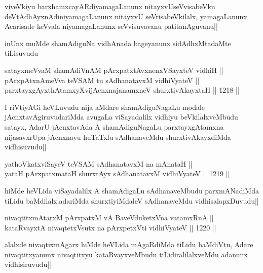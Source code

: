 \begin{artha}
viveVkiyu barxhamxcayARdiyamagaLanunx nitayxvUseVvisabeVku 
deVtAdhAyxnAdiniyamagaLanunx nitayxvU seVrisabeVkilalx, yamagaLanunx Acarisade keVvala 
niyamagaLanunx seVvisuvavanu patitanAguvanu||
\end{artha}

\begin{artha}
inUnx muMde shamAdiguNa vidhAnada bageyanunx sidAdhxMtadaMte tiLisuvudu
\end{artha}

\begin{shl}
satayxmeVvaM shamAdiVnAM pArxpatxtAvxnenxVSayxteV vidhiH || \\
pArxpAtxnAmeVva teVSAM tu sAdhanatavxM vidhiVyateV || \\
parxtayxgAyxthAtamxyXvijAcnxnajanamxneV shurxtivAkayxtaH ||  1218 ||  
\end{shl}

\begin{artha}
I riVtiyAGi heVLuvudu nija aMdare shamAdiguNagaLu modale jAcnxtavAgiruvudariMda avugaLa viSayadalilx vidhiyu beVkilalxveMbudu satayx, AdarU jAcnxtavAda A shamAdiguNagaLu parxtayxgAtamxna nijasavxrUpa jAcnxnavu huTaTxlu sAdhanaveMdu shurxtivAkayxdiMda vidhisuvudu||
\end{artha}


\begin{shl}
yathoVkatxviSayeV teVSAM sAdhanatavxM na mAnataH || \\
yataH pArxpatxmataH shurxtAyx sAdhanatavxM vidhiVyateV ||  1219 ||  
\end{shl}

\begin{artha}
hiMde heVLida viSayadalilx A shamAdigaLu sAdhanaveMbudu parxmANadiMda tiLidu baMdilalx.adariMda shurxtiyiMdaleV sAdhanaveMdu vidhisalapxDuvudu||
\end{artha}

\begin{shl}
nivaqtitxmAtarxM pArxpatxM vA BaveVduketxVna vatamxRnA || \\
kataRvayxtA nivaqtetxVsutx na pArxpetxVti vidhiVyateV ||  1220 ||  
\end{shl}

\begin{artha}
alalxde nivaqtixmAgarx hiMde heVLida mAgaRdiMda tiLidu baMdiVtu, Adare nivaqtitxyanunx nivaqtitxyu kataRvayxveMbudu tiLidiralilalxveMdu adanunx vidhisiruvudu||
\end{artha}

